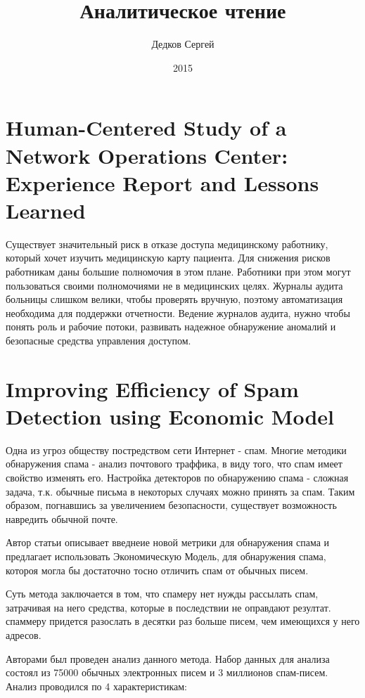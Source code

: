 \documentclass[11pt, a4paper]{article}		%
\author{Дедков Сергей}
\title{Аналитическое чтение}
\date{2015}
\begin{document}
\maketitle
\tableofcontents
\newpage


\section{Human-Centered Study of a Network Operations Center: Experience Report and Lessons Learned}

Существует значительный риск в отказе доступа медицинскому работнику, который хочет изучить медицинскую карту пациента. Для снижения рисков работникам даны большие полномочия в этом плане. Работники при этом могут пользоваться своими полномочиями не в медицинских целях. Журналы аудита больницы слишком велики, чтобы проверять вручную, поэтому автоматизация необходима для поддержки отчетности. Ведение журналов аудита, нужно чтобы понять роль и рабочие потоки, развивать надежное обнаружение аномалий и безопасные средства управления доступом.


\section{Improving Efficiency of Spam Detection using Economic Model}

Одна из угроз обществу постредством сети Интернет - спам. Многие методики обнаружения спама - анализ почтового траффика, в виду того, что спам имеет свойство изменять его. Настройка детекторов по обнаружению спама - сложная задача, т.к. обычные письма в некоторых случаях можно принять за спам. Таким образом, погнавшись за увеличением безопасности, существует возможность навредить обычной почте.

Автор статьи описывает введнеие новой метрики для обнаружения спама и предлагает использовать Экономическую Модель, для обнаружения спама, котороя могла бы достаточно тосно отличить спам от обычных писем.

Суть метода заключается в том, что спамеру нет нужды рассылать спам, затрачивая на него средства, которые в последствии не оправдают резултат. спаммеру придется разослать в десятки раз больше писем, чем имеющихся у него адресов.

Авторами был проведен анализ данного метода. Набор данных для анализа состоял из 75000 обычных электронных писем и 3 миллионов спам-писем.
Анализ проводился по 4 характеристикам:
\end{document}
